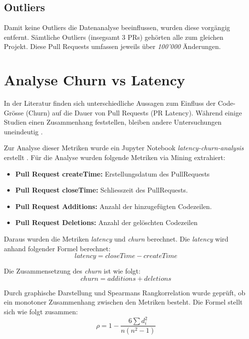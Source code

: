 \subsection{Outliers}
Damit keine Outliers die Datenanalyse beeinflussen, wurden diese vorgängig entfernt. Sämtliche Outliers (insegsamt 3 PRs) gehörten alle zum gleichen Projekt. Diese Pull Requests umfassen jeweils über \textit{100'000} Änderungen.

\section{Analyse Churn vs Latency}
In der Literatur finden sich unterschiedliche Aussagen zum Einfluss der Code-Grösse (Churn) auf die Dauer von Pull Requests (PR Latency). Während einige Studien einen Zusammenhang feststellen, bleiben andere Untersuchungen uneindeutig \parencite{hasan_understanding_2023}\parencite{kudrjavets_small_2022}.

Zur Analyse dieser Metriken wurde ein Jupyter Notebook \textit{latency-churn-analysis} erstellt \parencite{stumpf_simon_repo-detectivesba-metric-analysis-scripts_nodate}. Für die Analyse wurden folgende Metriken via Mining extrahiert:
\begin{itemize}
    \item \textbf{Pull Request createTime:} Erstellungsdatum des PullRequests
    \item \textbf{Pull Request closeTime:} Schliesszeit des PullRequests.
    \item \textbf{Pull Request Additions:} Anzahl der hinzugefügten Codezeilen.
    \item \textbf{Pull Request Deletions:} Anzahl der gelöschten Codezeilen
\end{itemize}

Daraus wurden die Metriken \textit{latency} und \textit{churn} berechnet. Die \textit{latency} wird anhand folgender Formel berechnet:
\begin{equation}
latency = closeTime - createTime
\end{equation}

Die Zusammensetzung des \textit{churn} ist wie folgt:
\begin{equation}
churn = additions + deletions
\end{equation}

Durch graphische Darstellung und Spearmans Rangkorrelation wurde geprüft, ob ein monotoner Zusammenhang zwischen den Metriken besteht. Die Formel stellt sich wie folgt zusammen:
\begin{equation}
\rho = 1 - \frac{6 \sum d_i^2}{n(n^2 - 1)}
\end{equation}


